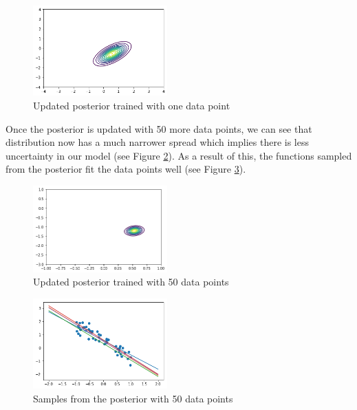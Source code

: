 \documentclass[10pt, a4paper, twocolumn]{article} %
\begin{document}
\begin{enumerate}
\begin{figure}[H]
      \centering
      \includegraphics[width = 0.46\textwidth]{imagesfinal/q12_finalposterior_2.png}
      \caption{Updated posterior trained with one data point}
      \label{fig:Q12_sample_1}
  \end{figure}
      
Once the posterior is updated with 50 more data points, we can see that distribution now has a much narrower spread which implies there is less uncertainty in our model (see Figure \ref{fig:Q12_sample_2}). As a result of this, the functions sampled from the posterior fit the data points well (see Figure \ref{fig:Q12_posterior_2}).
      
\begin{figure}[H]
      \centering
      \captionsetup{justification=centering, margin = 1cm}
      \includegraphics[width = 0.46\textwidth]{imagesfinal/Q12_finalposterior_4.png}
      \caption{Updated posterior trained with 50 data points}
      \label{fig:Q12_sample_2}
  \end{figure}
  
  \begin{figure}[H]
      \centering
      \includegraphics[width = 0.46\textwidth]{imagesfinal/Q12_finalposterior_3.png}
      \caption{Samples from the posterior with 50 data points}
      \label{fig:Q12_posterior_2}
  \end{figure}
      

\end{enumerate}
\end{document}
